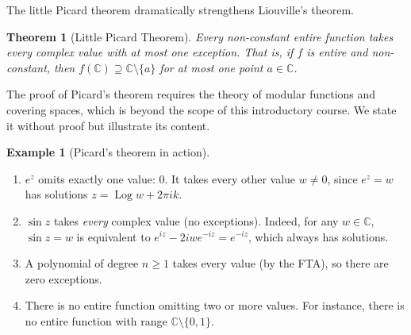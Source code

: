 \documentclass[12pt,a4paper,openany]{book}
\theoremstyle{definition}
\newtheorem{example}[definition]{Example}
\theoremstyle{plain}
\newtheorem{theorem}[definition]{Theorem}
\theoremstyle{remark}
\newcommand{\C}{\mathbb{C}}
\DeclareMathOperator{\Log}{Log}
\begin{document}
The little Picard theorem dramatically strengthens Liouville's theorem.

\begin{theorem}[Little Picard Theorem]\label{thm:little-picard}
Every non-constant entire function takes every complex value with at
most one exception. That is, if $f$ is entire and non-constant, then
$f(\C) \supseteq \C \setminus \{a\}$ for at most one point $a \in \C$.
\end{theorem}

The proof of Picard's theorem requires the theory of modular functions
and covering spaces, which is beyond the scope of this introductory
course. We state it without proof but illustrate its content.

\begin{example}[Picard's theorem in action]\label{ex:picard-examples}
\begin{enumerate}[label=(\roman*)]
  \item $e^z$ omits exactly one value: $0$. It takes every other value
    $w \neq 0$, since $e^z = w$ has solutions $z = \Log w + 2\pi i k$.
  \item $\sin z$ takes \emph{every} complex value (no exceptions).
    Indeed, for any $w \in \C$, $\sin z = w$ is equivalent to
    $e^{iz} - 2iw e^{-iz} = e^{-iz}$, which always has solutions.
  \item A polynomial of degree $n \geq 1$ takes every value (by the FTA),
    so there are zero exceptions.
  \item There is no entire function omitting two or more values.
    For instance, there is no entire function with range $\C \setminus \{0, 1\}$.
\end{enumerate}
\end{example}
\end{document}
